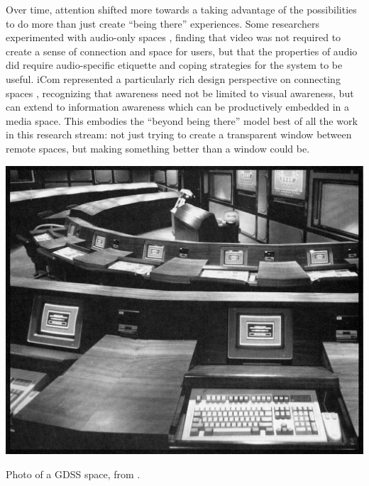\documentclass{tufte-handout}
\begin{document}
Over time, attention shifted more towards a taking advantage of the possibilities to do more than just create ``being there'' experiences. Some researchers experimented with audio-only spaces \citep{Hindus:1996cn}, finding that video was not required to create a sense of connection and space for users, but that the properties of audio did require audio-specific etiquette and coping strategies for the system to be useful. iCom represented a particularly rich design perspective on connecting spaces  \citep{Agamanolis:2003wc}, recognizing that awareness need not be limited to visual awareness, but can extend to information awareness which can be productively embedded in a media space. This embodies the ``beyond being there'' model best of all the work in this research stream: not just trying to create a transparent window between remote spaces, but making something better than a window could be.



\begin{marginfigure}
	\includegraphics{figures/nunamaker_gdss.png}
	\caption{Photo of a GDSS space, from \citep{nunamaker_electronic_1991}.}
	\label{fig:gdss}
\end{marginfigure}
\end{document}
